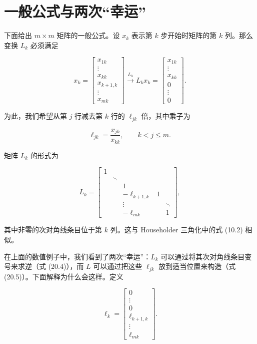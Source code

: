 \documentclass[UTF8,fontset=none,12pt]{ctexart}
\theoremstyle{definition}
\begin{document}
\section*{一般公式与两次“幸运”}

下面给出 $m\times m$ 矩阵的一般公式。设 $x_k$ 表示第 $k$ 步开始时矩阵的第 $k$ 列。那么变换 $L_k$ 必须满足

\begin{equation*}
x_k=
\begin{bmatrix}
x_{1k}\\
\vdots\\
x_{kk}\\
x_{k+1,k}\\
\vdots\\
x_{mk}
\end{bmatrix}
\xrightarrow{L_k}
L_kx_k=
\begin{bmatrix}
x_{1k}\\
\vdots\\
x_{kk}\\
0\\
\vdots\\
0
\end{bmatrix}.
\end{equation*}

为此，我们希望从第 $j$ 行减去第 $k$ 行的 $\ell_{jk}$ 倍，其中乘子为

\begin{equation}
\ell_{jk}=\frac{x_{jk}}{x_{kk}},
\qquad k<j\le m.
\tag{20.6}
\end{equation}

矩阵 $L_k$ 的形式为

\begin{equation*}
L_k=
\begin{bmatrix}
1&&&&\\
&\ddots&&&\\
&&1&&\\
&&-\ell_{k+1,k}&1&\\
&&\vdots&&\ddots\\
&&-\ell_{mk}&&1
\end{bmatrix},
\end{equation*}

其中非零的次对角线条目位于第 $k$ 列。这与 Householder 三角化中的式 (10.2) 相似。

在上面的数值例子中，我们看到了两次“幸运”：$L_k$ 可以通过将其次对角线条目变号来求逆（式 (20.4)），而 $L$ 可以通过把这些 $\ell_{jk}$ 放到适当位置来构造（式 (20.5)）。下面解释为什么会这样。定义

\begin{equation*}
\ell_k=
\begin{bmatrix}
0\\
\vdots\\
0\\
\ell_{k+1,k}\\
\vdots\\
\ell_{mk}
\end{bmatrix}.
\end{equation*}
\end{document}
